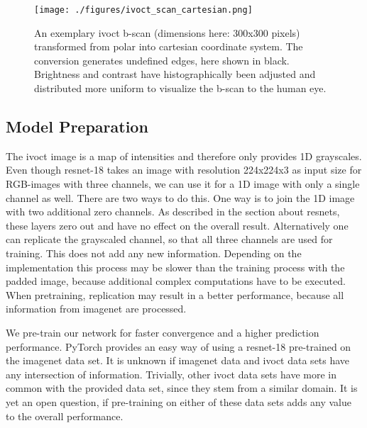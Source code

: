 \begin{figure}[htb]
	\centering
	\texttt{[image: ./figures/ivoct\_scan\_cartesian.png]}
	\caption[\acrshort{ivoct} cartesian \Gls{b-scan}]{An exemplary \acrshort{ivoct} \Gls{b-scan} (dimensions here: 300x300 pixels) transformed from polar into cartesian coordinate system. The conversion generates undefined edges, here shown in black. Brightness and contrast have histographically been adjusted and distributed more uniform to visualize the \Gls{b-scan} to the human eye.}
	\label{fig:scancart}
\end{figure}

\subsection{Model Preparation}

The \acrshort{ivoct} image is a map of intensities and therefore only provides 1D grayscales. Even though \acrshort{resnet}-18 takes an image with resolution 224x224x3 as input size for RGB-images with three channels, we can use it for a 1D image with only a single channel as well. There are two ways to do this. One way is to join the 1D image with two additional zero channels. As described in the section about \acrshort{resnet}s, these layers zero out and have no effect on the overall result. Alternatively one can replicate the grayscaled channel, so that all three channels are used for training. This does not add any new information. Depending on the implementation this process may be slower than the training process with the padded image, because additional complex computations have to be executed. When pretraining, replication may result in a better performance, because all information from \gls{imagenet} are processed.

We pre-train our network for faster convergence and a higher prediction performance. PyTorch provides an easy way of using a \acrshort{resnet}-18 pre-trained on the \gls{imagenet} data set. It is unknown if \gls{imagenet} data and \acrshort{ivoct} data sets have any intersection of information. Trivially, other \acrshort{ivoct} data sets have more in common with the provided data set, since they stem from a similar domain. It is yet an open question, if pre-training on either of these data sets adds any value to the overall performance.

